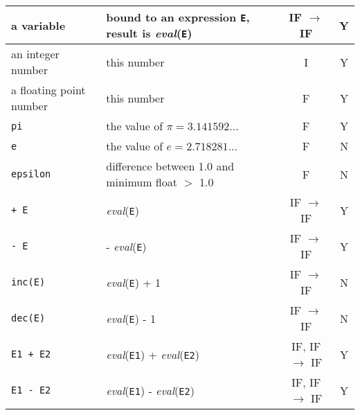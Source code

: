\begin{supertabular}{|l|L{7.5cm}|c|c|}
a variable & bound to an expression \texttt{E}, result is \textit{eval}(\texttt{E}) & IF $\rightarrow$ IF & Y \\

\hline

an integer number & this number & I & Y \\

\hline

a floating point number & this number & F & Y \\

\hline

\texttt{pi} & the value of $\pi = 3.141592...$ & F & Y \\

\hline

\texttt{e} & the value of $e = 2.718281...$ & F & N \\

\hline

\texttt{epsilon} & difference between 1.0 and minimum float $>$ 1.0 & F & N \\

\hline

\texttt{+ E} & \textit{eval}(\texttt{E}) & IF $\rightarrow$ IF & Y \\

\hline

\texttt{- E} & - \textit{eval}(\texttt{E}) & IF $\rightarrow$ IF & Y \\

\hline

\texttt{inc(E)} & \textit{eval}(\texttt{E}) + 1 & IF $\rightarrow$ IF & N \\

\hline

\texttt{dec(E)} & \textit{eval}(\texttt{E}) - 1 & IF $\rightarrow$ IF & N \\

\hline

\texttt{E1 + E2} & \textit{eval}(\texttt{E1}) + \textit{eval}(\texttt{E2}) &
IF, IF $\rightarrow$ IF & Y \\

\hline

\texttt{E1 - E2} & \textit{eval}(\texttt{E1}) - \textit{eval}(\texttt{E2}) &
IF, IF $\rightarrow$ IF & Y \\


\end{supertabular}
